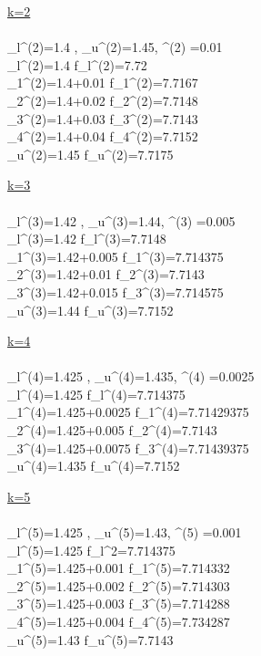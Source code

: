 \documentclass[]{report}
\begin{document}
\begin{program}
\underline{k=2}
\\
\\
\alpha_l^{(2)}=1.4 \; ,\; \alpha_u^{(2)}=1.45, \delta^{(2)} =0.01\\
\alpha_l^{(2)}=1.4 \; \Longrightarrow f_l^{(2)}=7.72\\
\alpha_1^{(2)}=1.4+0.01 \; \Longrightarrow f_1^{(2)}=7.7167\\
\alpha_2^{(2)}=1.4+0.02 \; \Longrightarrow f_2^{(2)}=7.7148\\
\alpha_3^{(2)}=1.4+0.03 \; \Longrightarrow f_3^{(2)}=7.7143\\
\alpha_4^{(2)}=1.4+0.04 \; \Longrightarrow f_4^{(2)}=7.7152\\
\alpha_u^{(2)}=1.45 \; \Longrightarrow f_u^{(2)}=7.7175
\end{program}
\begin{program}
\underline{k=3}
\\
\\
\alpha_l^{(3)}=1.42 \; ,\; \alpha_u^{(3)}=1.44, \delta^{(3)} =0.005\\
\alpha_l^{(3)}=1.42 \; \Longrightarrow f_l^{(3)}=7.7148\\
\alpha_1^{(3)}=1.42+0.005 \; \Longrightarrow f_1^{(3)}=7.714375\\
\alpha_2^{(3)}=1.42+0.01 \; \Longrightarrow f_2^{(3)}=7.7143\\
\alpha_3^{(3)}=1.42+0.015 \; \Longrightarrow f_3^{(3)}=7.714575\\
\alpha_u^{(3)}=1.44 \; \Longrightarrow f_u^{(3)}=7.7152
\end{program}
\begin{program}
\underline{k=4}
\\
\\
\alpha_l^{(4)}=1.425 \; ,\; \alpha_u^{(4)}=1.435, \delta^{(4)} =0.0025\\
\alpha_l^{(4)}=1.425 \; \Longrightarrow f_l^{(4)}=7.714375\\
\alpha_1^{(4)}=1.425+0.0025 \; \Longrightarrow f_1^{(4)}=7.71429375\\
\alpha_2^{(4)}=1.425+0.005 \; \Longrightarrow f_2^{(4)}=7.7143\\
\alpha_3^{(4)}=1.425+0.0075 \; \Longrightarrow f_3^{(4)}=7.71439375\\
\alpha_u^{(4)}=1.435 \; \Longrightarrow f_u^{(4)}=7.7152
\end{program}
\begin{program}
\underline{k=5}
\\
\\
\alpha_l^{(5)}=1.425 \; ,\; \alpha_u^{(5)}=1.43, \delta^{(5)} =0.001\\
\alpha_l^{(5)}=1.425 \; \Longrightarrow f_l^2=7.714375\\
\alpha_1^{(5)}=1.425+0.001 \; \Longrightarrow f_1^{(5)}=7.714332\\
\alpha_2^{(5)}=1.425+0.002 \; \Longrightarrow f_2^{(5)}=7.714303\\
\alpha_3^{(5)}=1.425+0.003 \; \Longrightarrow f_3^{(5)}=7.714288\\
\alpha_4^{(5)}=1.425+0.004 \; \Longrightarrow f_4^{(5)}=7.734287\\
\alpha_u^{(5)}=1.43 \; \Longrightarrow f_u^{(5)}=7.7143
\end{program}
\end{document}
